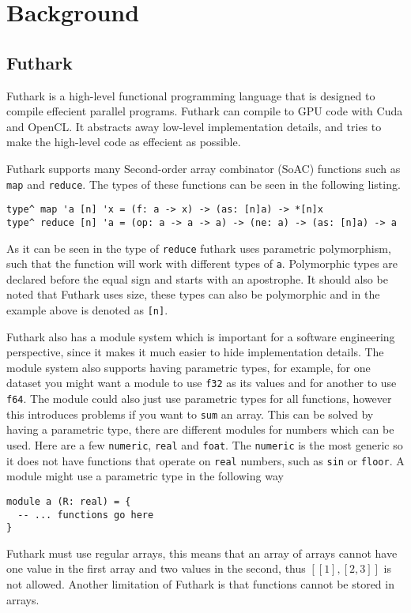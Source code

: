 \section{Background}
\subsection{Futhark}
Futhark is a high-level functional programming language that is designed to compile effecient parallel programs.
Futhark can compile to GPU code with Cuda and OpenCL.
It abstracts away low-level implementation details, and tries to make the high-level code as effecient as possible.

Futhark supports many Second-order array combinator (SoAC) functions such as \texttt{map} and \texttt{reduce}.
The types of these functions can be seen in the following listing.
\begin{lstlisting}
type^ map 'a [n] 'x = (f: a -> x) -> (as: [n]a) -> *[n]x
type^ reduce [n] 'a = (op: a -> a -> a) -> (ne: a) -> (as: [n]a) -> a
\end{lstlisting}
As it can be seen in the type of \texttt{reduce} futhark uses parametric polymorphism, such that the function will work with different types of \texttt{a}.
Polymorphic types are declared before the equal sign and starts with an apostrophe.
It should also be noted that Futhark uses size, these types can also be polymorphic and in the example above is denoted as \texttt{[n]}.

Futhark also has a module system which is important for a software engineering perspective, since it makes it much easier to hide implementation details.
The module system also supports having parametric types, for example, for one dataset you might want a module to use \texttt{f32} as its values and for another to use \texttt{f64}.
The module could also just use parametric types for all functions, however this introduces problems if you want to \texttt{sum} an array.
This can be solved by having a parametric type, there are different modules for numbers which can be used. Here are a few \texttt{numeric}, \texttt{real} and \texttt{foat}. The \texttt{numeric} is the most generic so it does not have functions that operate on \texttt{real} numbers, such as \texttt{sin} or \texttt{floor}.
A module might use a parametric type in the following way
\begin{lstlisting}
module a (R: real) = {
  -- ... functions go here
}
\end{lstlisting}

Futhark must use regular arrays, this means that an array of arrays cannot have one value in the first array and two values in the second, thus
$[[1],[2,3]]$
is not allowed.
Another limitation of Futhark is that functions cannot be stored in arrays.

